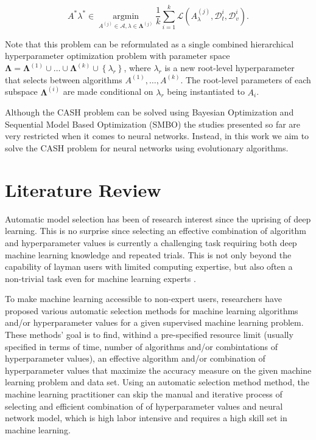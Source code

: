 \documentclass[journal]{IEEEtran}
\begin{document}
\begin{equation}
A^* \lambda^* \in \underset{A^{(j)} \in \mathcal{A}, \lambda \in \mathbf{\Lambda}^{(j)}}{\operatorname{argmin}} \frac{1}{k} \sum_{i=1}^{k} \mathcal{L} \left( A_{\lambda}^{(j)}, \mathcal{D}^{i}_{t},  \mathcal{D}^{i}_{v} \right).
\end{equation}

Note that this problem can be reformulated as a single combined hierarchical hyperparameter optimization problem with parameter space $\mathbf{\Lambda} =  \mathbf{\Lambda}^{(1)} \cup \ldots \cup \mathbf{\Lambda}^{(k)} \cup \left\lbrace \lambda_r \right\rbrace$, where $\lambda_r$ is a new root-level hyperparameter that selects between algorithms $A^{(1)}, \ldots, A^{(k)}$. The root-level parameters of each subspace $\mathbf{\Lambda}^{(i)}$ are made conditional on $\lambda_r$ being instantiated to $A_i$.

Although the CASH problem can be solved using Bayesian Optimization \cite{Brochu2010} and Sequential Model Based Optimization (SMBO) \cite{Hutter2011} the studies presented so far are very restricted when it comes to neural networks. Instead, in this work we aim to solve the CASH problem for neural networks using evolutionary algorithms.


\section{Literature Review}
\label{sec:literature_review}

Automatic model selection has been of research interest since the uprising of deep learning. This is no surprise since selecting an effective combination of algorithm and hyperparameter values is currently a challenging task requiring both deep machine learning knowledge and repeated trials. This is not only beyond the capability of layman users with limited computing expertise, but also often a non-trivial task even for machine learning experts \cite{sparks2015}. 

To make machine learning accessible to non-expert users, researchers have proposed various automatic selection methods for machine learning algorithms and/or hyperparameter values for a given supervised machine learning problem. These methods' goal is to find, withind a pre-specified resource limit (usually specified in terms of time, number of algorithms and/or combintations of hyperparameter values), an effective algorithm and/or combination of hyperparameter values that maximize the accuracy measure on the given machine learning problem and data set. Using an automatic selection method method, the machine learning practitioner can skip the manual and iterative process of selecting and efficient combination of of hyperparameter values and neural network model, which is high labor intensive and requires a high skill set in machine learning.
\end{document}
